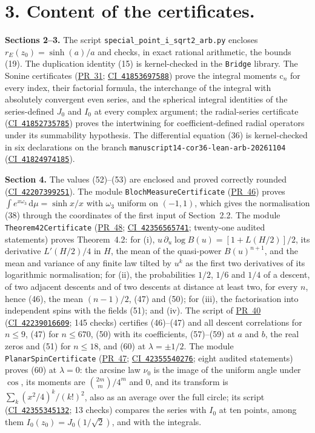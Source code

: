 \documentclass[11pt,a4paper]{article}
\newcommand{\R}{https://github.com/ralfanop/Certifications_Eulerian_polar-curve_computations}
\newcommand{\PR}[1]{\href{\R/pull/#1}{PR~#1}}
\newcommand{\CI}[1]{\href{\R/actions/runs/#1}{CI~\texttt{#1}}}
\newcommand{\eq}[1]{(#1)}
\newcommand{\rE}{r_E}
\begin{document}
\section*{3. Content of the certificates.}
\textbf{Sections 2--3.} The script \texttt{special\_point\_i\_sqrt2\_arb.py} encloses $\rE(z_0)=\sinh(a)/a$ and checks, in exact rational arithmetic, the bounds \eq{19}. The duplication identity \eq{15} is kernel-checked in the \texttt{Bridge} library. The Sonine certificates (\PR{31}; \CI{41853697588}) prove the integral moments $\mathrm c_n$ for every index, their factorial formula, the interchange of the integral with absolutely convergent even series, and the spherical integral identities of the series-defined $J_0$ and $I_0$ at every complex argument; the radial-series certificate (\CI{41852735785}) proves the intertwining for coefficient-defined radial operators under its summability hypothesis. The differential equation \eq{36} is kernel-checked in six declarations on the branch \texttt{manuscript14-cor36-lean-arb-20261104} (\CI{41824974185}).

\textbf{Section 4.} The values \eq{52}--\eq{53} are enclosed and proved correctly rounded (\CI{42207399251}). The module \texttt{BlochMeasureCertificate} (\PR{46}) proves $\int e^{x\omega_3}\,\mathrm d\mu=\sinh x/x$ with $\omega_3$ uniform on $(-1,1)$, which gives the normalisation \eq{38} through the coordinates of the first input of Section~2.2. The module \texttt{Theorem42Certificate} (\PR{48}; \CI{42356565741}; twenty-one audited statements) proves Theorem~4.2: for (i), $u\,\partial_u\log B(u)=[1+L(H/2)]/2$, its derivative $L'(H/2)/4$ in $H$, the mean of the quasi-power $B(u)^{n+1}$, and the mean and variance of any finite law tilted by $u^k$ as the first two derivatives of its logarithmic normalisation; for (ii), the probabilities $1/2$, $1/6$ and $1/4$ of a descent, of two adjacent descents and of two descents at distance at least two, for every $n$, hence \eq{46}, the mean $(n-1)/2$, \eq{47} and \eq{50}; for (iii), the factorisation into independent spins with the fields \eq{51}; and (iv). The script of \PR{40} (\CI{42239016609}; 145 checks) certifies \eq{46}--\eq{47} and all descent correlations for $n\leq9$, \eq{47} for $n\leq670$, \eq{50} with its coefficients, \eq{57}--\eq{59} at $a$ and $b$, the real zeros and \eq{51} for $n\leq18$, and \eq{60} at $\lambda=\pm1/2$. The module \texttt{PlanarSpinCertificate} (\PR{47}; \CI{42355540276}; eight audited statements) proves \eq{60} at $\lambda=0$: the arcsine law $\nu_0$ is the image of the uniform angle under $\cos$, its moments are $\binom{2m}{m}/4^m$ and $0$, and its transform is $\sum_k(x^2/4)^k/(k!)^2$, also as an average over the full circle; its script (\CI{42355345132}; 13 checks) compares the series with $I_0$ at ten points, among them $I_0(z_0)=J_0(1/\sqrt2)$, and with the integrals.
\end{document}
